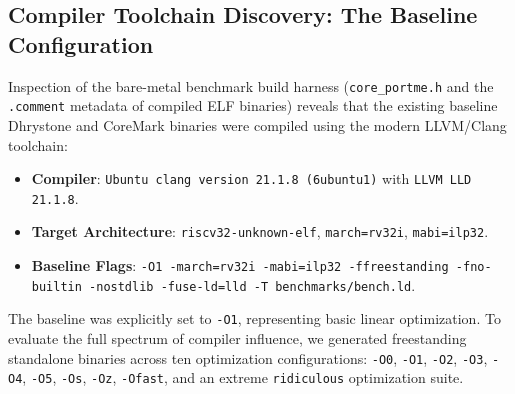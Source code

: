 \subsection{Compiler Toolchain Discovery: The Baseline Configuration}
Inspection of the bare-metal benchmark build harness (\texttt{core\_portme.h} and the \texttt{.comment} metadata of compiled ELF binaries) reveals that the existing baseline Dhrystone and CoreMark binaries were compiled using the modern LLVM/Clang toolchain:
\begin{itemize}
    \item \textbf{Compiler}: \texttt{Ubuntu clang version 21.1.8 (6ubuntu1)} with \texttt{LLVM LLD 21.1.8}.
    \item \textbf{Target Architecture}: \texttt{riscv32-unknown-elf}, \texttt{march=rv32i}, \texttt{mabi=ilp32}.
    \item \textbf{Baseline Flags}: \texttt{-O1 -march=rv32i -mabi=ilp32 -ffreestanding -fno-builtin -nostdlib -fuse-ld=lld -T benchmarks/bench.ld}.
\end{itemize}
The baseline was explicitly set to \texttt{-O1}, representing basic linear optimization. To evaluate the full spectrum of compiler influence, we generated freestanding standalone binaries across ten optimization configurations: \texttt{-O0}, \texttt{-O1}, \texttt{-O2}, \texttt{-O3}, \texttt{-O4}, \texttt{-O5}, \texttt{-Os}, \texttt{-Oz}, \texttt{-Ofast}, and an extreme \texttt{ridiculous} optimization suite.

